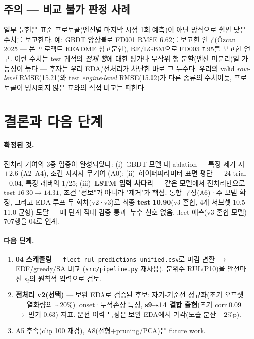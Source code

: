 \documentclass[11pt]{article}
\begin{document}
\subsection{주의 — 비교 불가 판정 사례}

일부 문헌은 표준 프로토콜(엔진별 마지막 시점 1회 예측)이 아닌 방식으로 훨씬 낮은 수치를 보고한다.
예: GBDT 앙상블로 FD001 RMSE 6.62를 보고한 연구(Özcan 2025 — 본 프로젝트 README 참고문헌), RF/LGBM으로 FD003 7.95를 보고한 연구.
이런 수치는 test 궤적의 \emph{전체 행}에 대한 평가나 무작위 행 분할(엔진 미분리)일 가능성이 높다 —
후자는 우리 EDA/전처리가 차단한 바로 그 누수다.
우리의 valid \emph{row-level} RMSE(15.21)와 test \emph{engine-level} RMSE(15.02)가 다른 종류의 수치이듯,
프로토콜이 명시되지 않은 표와의 직접 비교는 피한다.

\section{결론과 다음 단계}

\paragraph{확정된 것.}
전처리 기여의 3중 입증이 완성되었다:
(i)~GBDT 모델 내 ablation — 특징 제거 시 $+2.6$ (A2--A4), 조건 지시자 무기여 (A0);
(ii)~하이퍼파라미터 표면 평탄 — 24 trial $-0.04$, 특징 레버의 1/25;
(iii)~\textbf{LSTM 입력 사다리} — 같은 모델에서 전처리만으로 test $16.30\to14.31$, 조건 "정보"가 아니라 "제거"가 핵심.
통합 구성(A6)·주 모델 확정, 그리고 EDA 루프 두 회차(v2·v3)로 최종 \textbf{test 10.90}(v3 혼합, 4개 서브셋 10.5--11.0 균형) 도달 — 매 단계 적대 검증 통과, 누수 신호 없음.
fleet 예측(v3 혼합 모델) 707행을 04로 인계.

\paragraph{다음 단계.}
\begin{enumerate}[nosep]
  \item \textbf{04 스케줄링} — \texttt{fleet\_rul\_predictions\_unified.csv}로 마감 변환 $\to$ EDF/greedy/SA 비교 (\texttt{src/pipeline.py} 재사용).
        분위수 RUL(P10)을 안전마진 $s_i$의 원칙적 입력으로 검토.
  \item \textbf{전처리 v2(선택)} — 보완 EDA로 검증된 후보: 자기-기준선 정규화(초기 오프셋 $=$ 열화량의 $\sim$20\%),
        onset·누적손상 특징, \textbf{s9--s14 결합 출현}(초기 corr 0.09 $\to$ 말기 0.63) 지표.
        운전 이력 특징은 보완 EDA에서 기각(노출 분산 $\pm2\%$p).
  \item A5 후속(clip 100 재검), A8(선형$+$pruning/PCA)은 future work.
\end{enumerate}
\end{document}
